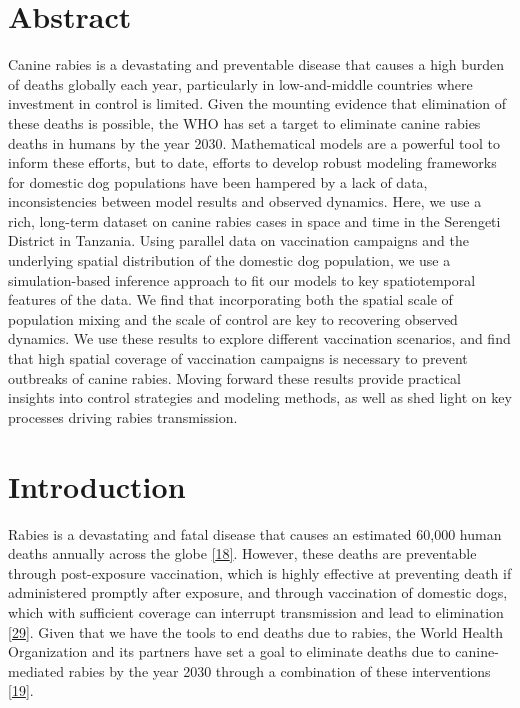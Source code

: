 \documentclass[
  oneside]{book}
\newcommand{\beginmain}{
  \setcounter{table}{0}  
  \renewcommand{\thetable}{\arabic{chapter}.\arabic{table}} 
  \setcounter{figure}{0} 
  \renewcommand{\thefigure}{\arabic{chapter}.\arabic{figure}}
}
\begin{document}
\newpage
\beginmain

\setlength{\parskip}{2em}

\hypertarget{abstract-3}{%
\section*{Abstract}\label{abstract-3}}

Canine rabies is a devastating and preventable disease that causes a high burden of deaths globally each year, particularly in low-and-middle countries where investment in control is limited. Given the mounting evidence that elimination of these deaths is possible, the WHO has set a target to eliminate canine rabies deaths in humans by the year 2030. Mathematical models are a powerful tool to inform these efforts, but to date, efforts to develop robust modeling frameworks for domestic dog populations have been hampered by a lack of data, inconsistencies between model results and observed dynamics. Here, we use a rich, long-term dataset on canine rabies cases in space and time in the Serengeti District in Tanzania. Using parallel data on vaccination campaigns and the underlying spatial distribution of the domestic dog population, we use a simulation-based inference approach to fit our models to key spatiotemporal features of the data. We find that incorporating both the spatial scale of population mixing and the scale of control are key to recovering observed dynamics. We use these results to explore different vaccination scenarios, and find that high spatial coverage of vaccination campaigns is necessary to prevent outbreaks of canine rabies. Moving forward these results provide practical insights into control strategies and modeling methods, as well as shed light on key processes driving rabies transmission.

\hypertarget{introduction-4}{%
\section{Introduction}\label{introduction-4}}

Rabies is a devastating and fatal disease that causes an estimated 60,000 human deaths annually across the globe \protect\hyperlink{ref-hampson2015}{{[}18{]}}. However, these deaths are preventable through post-exposure vaccination, which is highly effective at preventing death if administered promptly after exposure, and through vaccination of domestic dogs, which with sufficient coverage can interrupt transmission and lead to elimination \protect\hyperlink{ref-lankester2014}{{[}29{]}}. Given that we have the tools to end deaths due to rabies, the World Health Organization and its partners have set a goal to eliminate deaths due to canine-mediated rabies by the year 2030 through a combination of these interventions \protect\hyperlink{ref-abela-ridder2016}{{[}19{]}}.
\end{document}
